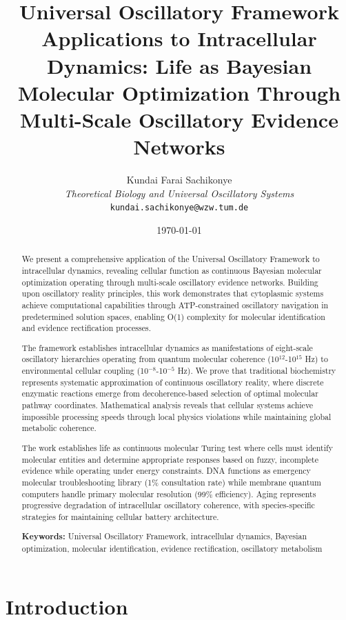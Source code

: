 \documentclass[12pt,a4paper]{article}
\title{\textbf{Universal Oscillatory Framework Applications to Intracellular Dynamics: Life as Bayesian Molecular Optimization Through Multi-Scale Oscillatory Evidence Networks}}
\author{
Kundai Farai Sachikonye\\
\textit{Theoretical Biology and Universal Oscillatory Systems}\\
\texttt{kundai.sachikonye@wzw.tum.de}
}
\date{\today}
\begin{document}
\maketitle

\begin{abstract}
We present a comprehensive application of the Universal Oscillatory Framework to intracellular dynamics, revealing cellular function as continuous Bayesian molecular optimization operating through multi-scale oscillatory evidence networks. Building upon oscillatory reality principles, this work demonstrates that cytoplasmic systems achieve computational capabilities through ATP-constrained oscillatory navigation in predetermined solution spaces, enabling O(1) complexity for molecular identification and evidence rectification processes.

The framework establishes intracellular dynamics as manifestations of eight-scale oscillatory hierarchies operating from quantum molecular coherence (10$^{12}$-10$^{15}$ Hz) to environmental cellular coupling (10$^{-8}$-10$^{-5}$ Hz). We prove that traditional biochemistry represents systematic approximation of continuous oscillatory reality, where discrete enzymatic reactions emerge from decoherence-based selection of optimal molecular pathway coordinates. Mathematical analysis reveals that cellular systems achieve impossible processing speeds through local physics violations while maintaining global metabolic coherence.

The work establishes life as continuous molecular Turing test where cells must identify molecular entities and determine appropriate responses based on fuzzy, incomplete evidence while operating under energy constraints. DNA functions as emergency molecular troubleshooting library (1\% consultation rate) while membrane quantum computers handle primary molecular resolution (99\% efficiency). Aging represents progressive degradation of intracellular oscillatory coherence, with species-specific strategies for maintaining cellular battery architecture.

\textbf{Keywords:} Universal Oscillatory Framework, intracellular dynamics, Bayesian optimization, molecular identification, evidence rectification, oscillatory metabolism
\end{abstract}

\section{Introduction}
\end{document}
